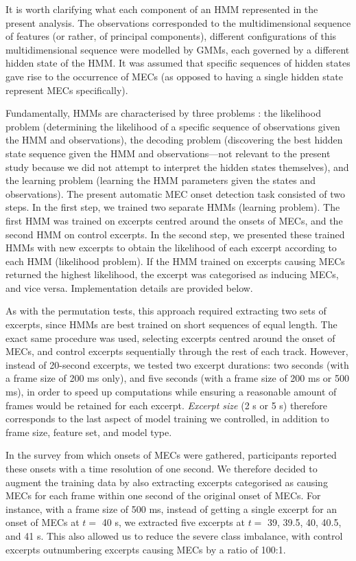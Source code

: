 It is worth clarifying what each component of an HMM represented in the present analysis. The observations corresponded to the multidimensional sequence of features (or rather, of principal components), different configurations of this multidimensional sequence were modelled by GMMs, each governed by a different hidden state of the HMM. It was assumed that specific sequences of hidden states gave rise to the occurrence of MECs (as opposed to having a single hidden state represent MECs specifically). 

Fundamentally, HMMs are characterised by three problems \parencite{jurafsky2021,rabiner1989}: the likelihood problem (determining the likelihood of a specific sequence of observations given the HMM and observations), the decoding problem (discovering the best hidden state sequence given the HMM and observations---not relevant to the present study because we did not attempt to interpret the hidden states themselves), and the learning problem (learning the HMM parameters given the states and observations). The present automatic MEC onset detection task consisted of two steps. In the first step, we trained two separate HMMs (learning problem). The first HMM was trained on excerpts centred around the onsets of MECs, and the second HMM on control excerpts. In the second step, we presented these trained HMMs with new excerpts to obtain the likelihood of each excerpt according to each HMM (likelihood problem). If the HMM trained on excerpts causing MECs returned the highest likelihood, the excerpt was categorised as inducing MECs, and vice versa. Implementation details are provided below.

As with the permutation tests, this approach required extracting two sets of excerpts, since HMMs are best trained on short sequences of equal length. The exact same procedure was used, selecting excerpts centred around the onset of MECs, and control excerpts sequentially through the rest of each track. However, instead of 20-second excerpts, we tested two excerpt durations: two seconds (with a frame size of 200 ms only), and five seconds (with a frame size of 200 ms or 500 ms), in order to speed up computations while ensuring a reasonable amount of frames would be retained for each excerpt. \emph{Excerpt size} (2 s or 5 s) therefore corresponds to the last aspect of model training we controlled, in addition to frame size, feature set, and model type.

In the survey from which onsets of MECs were gathered, participants reported these onsets with a time resolution of one second. We therefore decided to augment the training data by also extracting excerpts categorised as causing MECs for each frame within one second of the original onset of MECs. For instance, with a frame size of 500 ms, instead of getting a single excerpt for an onset of MECs at $t =$ 40 s, we extracted five excerpts at $t =$ 39, 39.5, 40, 40.5, and 41 s. This also allowed us to reduce the severe class imbalance, with control excerpts outnumbering excerpts causing MECs by a ratio of 100:1.

